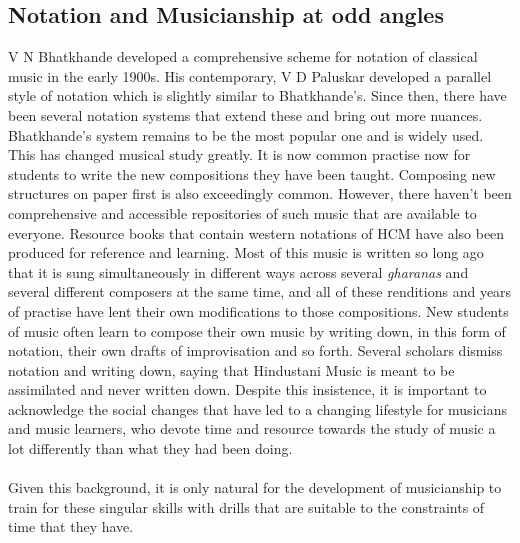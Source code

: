 \documentclass{tufte-handout}
\begin{document}
\subsection{Notation and Musicianship at odd angles} V N Bhatkhande developed a comprehensive scheme for notation of classical music in the early 1900s. \cite{bhatkhande} His contemporary, V D Paluskar developed a parallel style of notation which is slightly similar to Bhatkhande's. Since then, there have been several notation systems that extend these and bring out more nuances. Bhatkhande's system remains to be the most popular one and is widely used. This has changed musical study greatly. It is now common practise now for students to write the new compositions they have been taught. Composing new structures on paper first is also exceedingly common. However, there haven't been comprehensive and accessible repositories of such music that are available to everyone. Resource books that contain western notations of HCM have also been produced for reference and learning. \cite{kauffman} \cite{ragaguide} Most of this music is written so long ago that it is sung simultaneously in different ways across several \textit{gharanas} and several different composers at the same time, and all of these renditions and years of practise have lent their own modifications to those compositions.\cite{jairazbhoy} New students of music often learn to compose their own music by writing down, in this form of notation, their own drafts of improvisation and so forth. Several scholars dismiss notation and writing down, saying that Hindustani Music is meant to be assimilated and never written down. Despite this insistence, it is important to acknowledge the social changes that have led to a changing lifestyle for musicians and music learners, who devote time and resource towards the study of music a lot differently than what they had been doing.
\paragraph{}Given this background, it is only natural for the development of musicianship to train for these singular skills with drills that are suitable to the constraints of time that they have.
\end{document}
